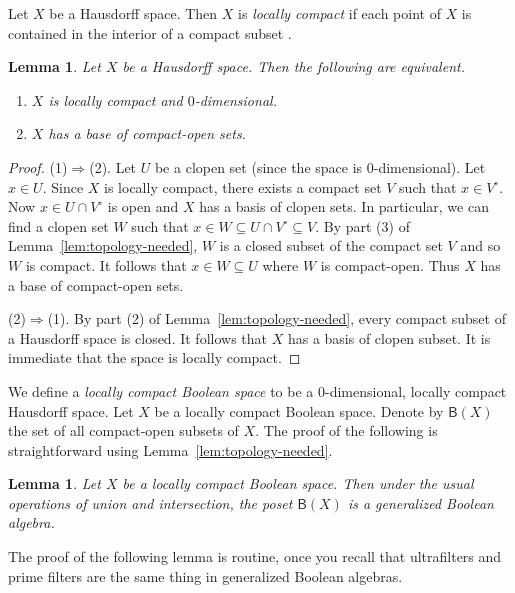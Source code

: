 \documentclass[a4paper]{amsart}
\newtheorem{lemma}[theorem]{Lemma}
\begin{document}
Let $X$ be a Hausdorff space.
Then $X$ is {\em locally compact} if each point of $X$ is contained in the interior of a compact subset \cite[Theorem 18.2]{Willard}.

\begin{lemma}\label{lem:boolean-space} Let $X$ be a Hausdorff space.
Then the following are equivalent.
\begin{enumerate}
\item $X$ is locally compact and $0$-dimensional.
\item $X$ has a base of compact-open sets.
\end{enumerate}
\end{lemma}
\begin{proof} (1)$\Rightarrow$(2).
Let $U$ be a clopen set (since the space is $0$-dimensional).
Let $x \in U$.
Since $X$ is locally compact, there exists a compact set $V$ such that $x \in V^{\circ}$.
Now $x \in U \cap V^{\circ}$ is open and $X$ has a basis of clopen sets.
In particular, we can find a clopen set $W$ such that $x \in W \subseteq U \cap V^{\circ} \subseteq V$.
By part (3) of Lemma~\ref{lem:topology-needed},
$W$ is a closed subset of the compact set $V$ and so $W$ is compact.
It follows that $x \in W \subseteq U$ where $W$ is compact-open.
Thus $X$ has a base of compact-open sets.

(2)$\Rightarrow$(1).
By part (2) of Lemma~\ref{lem:topology-needed},
every compact subset of a Hausdorff space is closed.
It follows that $X$ has a basis of clopen subset.
It is immediate that the space is locally compact.
\end{proof}

We define a {\em locally compact Boolean space} to be a $0$-dimensional, locally compact Hausdorff space.
Let $X$ be a locally compact Boolean space.
Denote by $\mathsf{B}(X)$ the set of all compact-open subsets of $X$.
The proof of the following is straightforward using Lemma~\ref{lem:topology-needed}.

\begin{lemma}\label{lem:compact-open} Let $X$ be a locally compact Boolean space.
Then under the usual operations of union and intersection, 
the poset $\mathsf{B}(X)$ is a generalized Boolean algebra.
\end{lemma}


The proof of the following lemma is routine, once you recall that ultrafilters and prime filters
are the same thing in generalized Boolean algebras.
\end{document}

